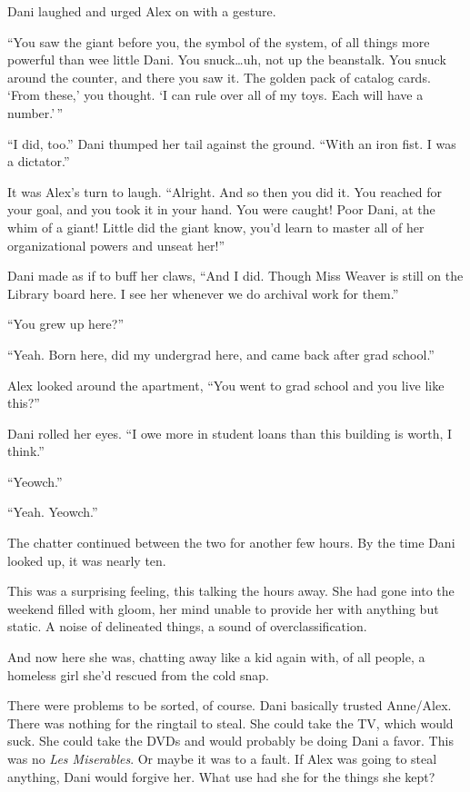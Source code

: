 Dani laughed and urged Alex on with a gesture.

``You saw the giant before you, the symbol of the system, of all things more powerful than wee little Dani. You snuck\ldots{}uh, not up the beanstalk. You snuck around the counter, and there you saw it. The golden pack of catalog cards. `From these,' you thought. `I can rule over all of my toys. Each will have a number.'\,''

``I did, too.'' Dani thumped her tail against the ground. ``With an iron fist. I was a dictator.''

It was Alex's turn to laugh. ``Alright. And so then you did it. You reached for your goal, and you took it in your hand. You were caught! Poor Dani, at the whim of a giant! Little did the giant know, you'd learn to master all of her organizational powers and unseat her!''

Dani made as if to buff her claws, ``And I did. Though Miss Weaver is still on the Library board here. I see her whenever we do archival work for them.''

``You grew up here?''

``Yeah. Born here, did my undergrad here, and came back after grad school.''

Alex looked around the apartment, ``You went to grad school and you live like this?''

Dani rolled her eyes. ``I owe more in student loans than this building is worth, I think.''

``Yeowch.''

``Yeah. Yeowch.''

The chatter continued between the two for another few hours. By the time Dani looked up, it was nearly ten.

This was a surprising feeling, this talking the hours away. She had gone into the weekend filled with gloom, her mind unable to provide her with anything but static. A noise of delineated things, a sound of overclassification.

And now here she was, chatting away like a kid again with, of all people, a homeless girl she'd rescued from the cold snap.

There were problems to be sorted, of course. Dani basically trusted Anne/Alex. There was nothing for the ringtail to steal. She could take the TV, which would suck. She could take the DVDs and would probably be doing Dani a favor. This was no \emph{Les Miserables}. Or maybe it was to a fault. If Alex was going to steal anything, Dani would forgive her. What use had she for the things she kept?

